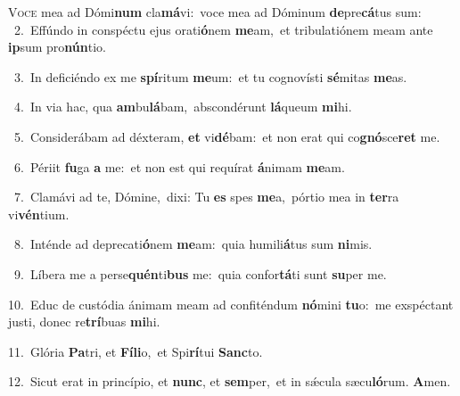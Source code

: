 \lettrine{\initial\textcolor{\initialcolor}{V}}{oce} mea ad Dómi\textbf{num} cla\-\textbf{má}\-vi:~\star voce mea ad Dóminum \textbf{de}\-pre\-\textbf{cá}\-tus sum:\\
{\numbfont\textcolor{\numbcolor}{~2.}}~Effúndo in conspéctu ejus orati\-\textbf{ó}\-nem \textbf{me}\-am,~\star et tribulatiónem meam ante \textbf{ip}\-sum pro\-\textbf{nún}\-tio.\par
{\numbfont\textcolor{\numbcolor}{~3.}}~In deficiéndo ex me \textbf{spí}\-ritum \textbf{me}\-um:~\star et tu cognovísti \textbf{sé}\-mitas \textbf{me}\-as.\par
{\numbfont\textcolor{\numbcolor}{~4.}}~In via hac, qua \textbf{am}\-bu\-\textbf{lá}\-bam,~\star abscondérunt \textbf{lá}\-queum \textbf{mi}\-hi.\par
{\numbfont\textcolor{\numbcolor}{~5.}}~Considerábam ad déxteram, \textbf{et} vi\-\textbf{dé}\-bam:~\star et non erat qui co\-\textbf{gnó}\-sce\textbf{ret} me.\par
{\numbfont\textcolor{\numbcolor}{~6.}}~Périit \textbf{fu}\-ga \textbf{a} me:~\star et non est qui requírat \textbf{á}\-nimam \textbf{me}\-am.\par
{\numbfont\textcolor{\numbcolor}{~7.}}~Clamávi ad te, Dómine,~\dagger dixi: Tu \textbf{es} spes \textbf{me}\-a,~\star pórtio mea in \textbf{ter}\-ra vi\-\textbf{vén}\-tium.\par
{\numbfont\textcolor{\numbcolor}{~8.}}~Inténde ad deprecati\-\textbf{ó}\-nem \textbf{me}\-am:~\star quia humili\-\textbf{á}\-tus sum \textbf{ni}\-mis.\par
{\numbfont\textcolor{\numbcolor}{~9.}}~Líbera me a perse\-\textbf{quén}\-ti\textbf{bus} me:~\star quia confor\-\textbf{tá}\-ti sunt \textbf{su}\-per me.\par
{\numbfont\textcolor{\numbcolor}{10.}}~Educ de custódia ánimam meam ad confiténdum \textbf{nó}\-mini \textbf{tu}\-o:~\star me exspéctant justi, donec re\-\textbf{trí}\-buas \textbf{mi}\-hi.\par
{\numbfont\textcolor{\numbcolor}{11.}}~Glória \textbf{Pa}\-tri, et \textbf{Fí}\-\textbf{li}o,~\star et Spi\-\textbf{rí}\-tui \textbf{Sanc}\-to.\par
{\numbfont\textcolor{\numbcolor}{12.}}~Sicut erat in princípio, et \textbf{nunc}\-, et \textbf{sem}\-per,~\star et in sǽcula sæcu\-\textbf{ló}\-rum. \textbf{A}\-men.\par
